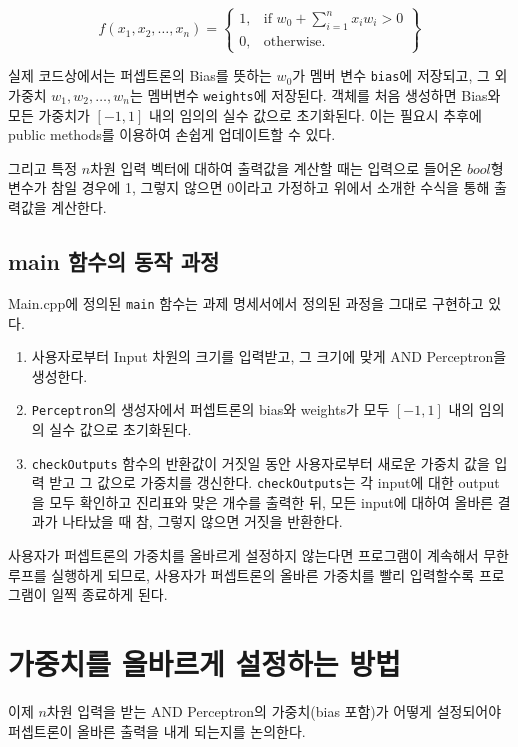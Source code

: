 \documentclass[letterpaper,10pt]{article}
\begin{document}
\[
f(x_1, x_2, \dots, x_n)=\left.
\begin{cases}
    1, & \text{if }w_0 + \sum_{i=1}^{n} x_i w_i > 0\\
    0, & \text{otherwise.}
\end{cases}
\right\}
\]

실제 코드상에서는 퍼셉트론의 Bias를 뜻하는 $w_0$가 멤버 변수 \texttt{bias}에 저장되고, 그 외 가중치 $w_1, w_2, \dots, w_n$는 멤버변수 \texttt{weights}에 저장된다. 객체를 처음 생성하면 Bias와 모든 가중치가 $[-1, 1]$ 내의 임의의 실수 값으로 초기화된다. 이는 필요시 추후에 public methods를 이용하여 손쉽게 업데이트할 수 있다.

그리고 특정 $n$차원 입력 벡터에 대하여 출력값을 계산할 때는 입력으로 들어온 $bool$형 변수가 참일 경우에 1, 그렇지 않으면 0이라고 가정하고 위에서 소개한 수식을 통해 출력값을 계산한다.

\subsection{main 함수의 동작 과정}

Main.cpp에 정의된 \texttt{main} 함수는 과제 명세서에서 정의된 과정을 그대로 구현하고 있다.

\begin{enumerate}
    \item 사용자로부터 Input 차원의 크기를 입력받고, 그 크기에 맞게 AND Perceptron을 생성한다.
    \item \texttt{Perceptron}의 생성자에서 퍼셉트론의 bias와 weights가 모두 $[-1, 1]$ 내의 임의의 실수 값으로 초기화된다.
    \item \texttt{checkOutputs} 함수의 반환값이 거짓일 동안 사용자로부터 새로운 가중치 값을 입력 받고 그 값으로 가중치를 갱신한다. \texttt{checkOutputs}는 각 input에 대한 output을 모두 확인하고 진리표와 맞은 개수를 출력한 뒤, 모든 input에 대하여 올바른 결과가 나타났을 때 참, 그렇지 않으면 거짓을 반환한다.
\end{enumerate}

사용자가 퍼셉트론의 가중치를 올바르게 설정하지 않는다면 프로그램이 계속해서 무한 루프를 실행하게 되므로, 사용자가 퍼셉트론의 올바른 가중치를 빨리 입력할수록 프로그램이 일찍 종료하게 된다.

\section{가중치를 올바르게 설정하는 방법}

이제 $n$차원 입력을 받는 AND Perceptron의 가중치(bias 포함)가 어떻게 설정되어야 퍼셉트론이 올바른 출력을 내게 되는지를 논의한다.
\end{document}
